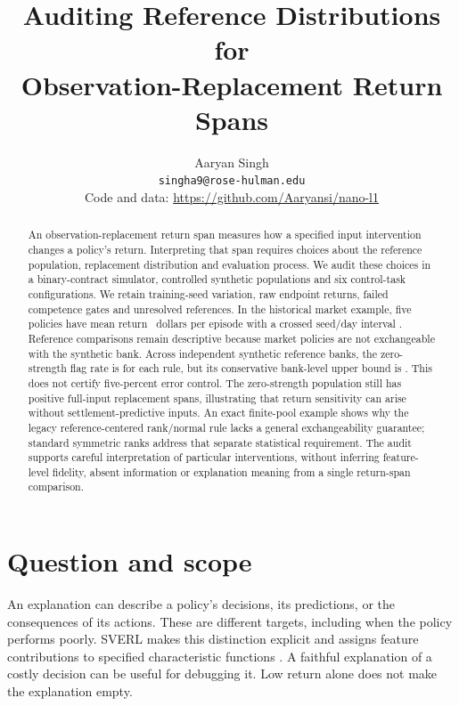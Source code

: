 \documentclass[10pt,twocolumn]{article}
\title{Auditing Reference Distributions for\\ Observation-Replacement Return Spans}
\author{Aaryan Singh\\
\small\texttt{singha9@rose-hulman.edu}\\
\small Code and data: \url{https://github.com/Aaryansi/nano-l1}}
\date{}
\begin{document}
\raggedbottom
\maketitle
\ifdefined\layoutfixture
\begin{center}\end{center}
\fi
\begin{abstract}
An observation-replacement return span measures how a specified input
intervention changes a policy's return. Interpreting that span requires choices
about the reference population, replacement distribution and evaluation process.
We audit these choices in a binary-contract simulator, controlled synthetic
populations and six control-task configurations. We retain training-seed
variation, raw endpoint returns, failed competence gates and unresolved
references. In the historical market example, five policies have mean return
\MarketMean\ dollars per episode with a crossed seed/day interval
\MarketInterval. Reference comparisons remain descriptive because market
policies are not exchangeable with the synthetic bank. Across \BankCount{}
independent synthetic reference banks, the zero-strength flag rate is
\BankNullRate{} for each rule, but its conservative bank-level upper bound is
\BankNullUpper. This does not certify five-percent error control.
The zero-strength population still has positive full-input replacement spans,
illustrating that return sensitivity can arise without settlement-predictive inputs.
An exact finite-pool example shows why the legacy reference-centered
rank/normal rule lacks a general exchangeability guarantee; standard symmetric
ranks address that separate statistical requirement. The audit supports
careful interpretation of particular interventions, without inferring
feature-level fidelity, absent information or explanation meaning from a
single return-span comparison.
\end{abstract}

\section{Question and scope}
An explanation can describe a policy's decisions, its predictions, or the
consequences of its actions. These are different targets, including when the
policy performs poorly. SVERL makes this distinction explicit and assigns
feature contributions to specified characteristic functions
\citep{beechey2023,beechey2025}. A faithful explanation of a costly decision can
be useful for debugging it. Low return alone does not make the explanation
empty.
\end{document}
